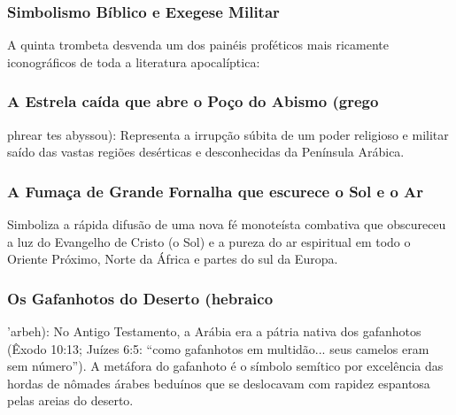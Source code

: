 \documentclass[11pt,a4paper,openany]{book}
\begin{document}
\subsubsection*{Simbolismo Bíblico e Exegese Militar}
A quinta trombeta desvenda um dos painéis proféticos mais ricamente iconográficos de toda a literatura apocalíptica:

\subsubsection*{A Estrela caída que abre o Poço do Abismo (grego}
phrear tes abyssou): Representa a irrupção súbita de um poder religioso e militar saído das vastas regiões desérticas e desconhecidas da Península Arábica.

\subsubsection*{A Fumaça de Grande Fornalha que escurece o Sol e o Ar}
Simboliza a rápida difusão de uma nova fé monoteísta combativa que obscureceu a luz do Evangelho de Cristo (o Sol) e a pureza do ar espiritual em todo o Oriente Próximo, Norte da África e partes do sul da Europa.

\subsubsection*{Os Gafanhotos do Deserto (hebraico}
'arbeh): No Antigo Testamento, a Arábia era a pátria nativa dos gafanhotos (Êxodo 10:13; Juízes 6:5: ``como gafanhotos em multidão... seus camelos eram sem número''). A metáfora do gafanhoto é o símbolo semítico por excelência das hordas de nômades árabes beduínos que se deslocavam com rapidez espantosa pelas areias do deserto.
\end{document}

